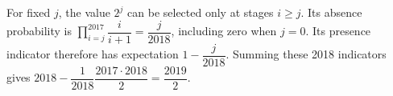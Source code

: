 For fixed $ j $, the value $ 2^j $ can be selected only at stages $ i\ge j $. Its absence probability is $\prod_{i=j}^{2017}\dfrac{i}{i+1}=\dfrac{j}{2018}$, including zero when $ j=0 $. Its presence indicator therefore has expectation $ 1-\dfrac{j}{2018}$. Summing these 2018 indicators gives $ 2018-\dfrac{1}{2018}\dfrac{2017\cdot2018}{2}=\boxed{\dfrac{2019}{2}}$.
